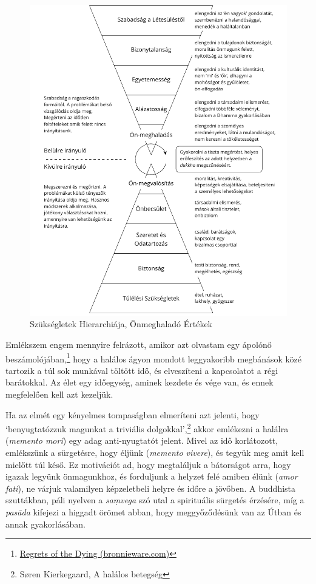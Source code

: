 \begin{figure}[h]
\caption{Szükségletek Hierarchiája, Önmeghaladó Értékek}\label{fig-self-transcendental}
\bigskip
\includegraphics[width=\linewidth]{./manuscript/tex/diagrams/self-transcendental-values-hu.pdf}
\end{figure}

\clearpage
\normalpagelayout

Emlékszem engem mennyire felrázott, amikor azt olvastam egy ápolónő
beszámolójában,\footnote{\href{https://bronnieware.com/blog/regrets-of-the-dying/}{Regrets
  of the Dying (bronnieware.com)}} hogy a halálos ágyon mondott
leggyakoribb megbánások közé tartozik a túl sok munkával töltött idő, és
elveszíteni a kapcsolatot a régi barátokkal. Az élet egy időegység,
aminek kezdete és vége van, és ennek megfelelően kell azt kezeljük.


Ha az elmét egy kényelmes tompaságban elmeríteni azt jelenti, hogy
`benyugtatózzuk magunkat a triviális dolgokkal',\footnote{Søren Kierkegaard,
   A halálos betegség} akkor emlékezni a
halálra (\emph{memento mori}) egy adag anti-nyugtatót jelent. Mivel az
idő korlátozott, emlékszünk a sürgetésre, hogy éljünk (\emph{memento
vivere}), és tegyük meg amit kell mielőtt túl késő. Ez motivációt ad,
hogy megtaláljuk a bátorságot arra, hogy igazak legyünk önmagunkhoz, és
forduljunk a helyzet felé amiben élünk (\emph{amor fati}), ne várjuk
valamilyen képzeletbeli helyre és időre a jövőben. A buddhista
szuttákban, páli nyelven a \emph{saṃvega} szó utal a spirituális
sürgetés érzésére, míg a \emph{pasāda} kifejezi a higgadt örömet abban,
hogy meggyőződésünk van az Útban és annak gyakorlásában.

